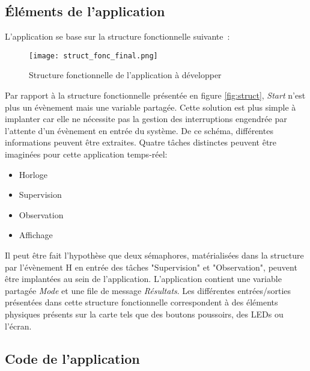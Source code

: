\subsection{Éléments de l'application}

L'application se base sur la structure fonctionnelle suivante :

\begin{figure}[h]
    \centering
    \texttt{[image: struct\_fonc\_final.png]}
    \caption{Structure fonctionnelle de l'application à développer}
    \label{fig:struct_final}
\end{figure}

\indent Par rapport à la structure fonctionnelle présentée en figure \ref{fig:struct}, \textit{Start} n'est plus un évènement mais une variable partagée.
Cette solution est plus simple à implanter car elle ne nécessite pas la gestion des interruptions engendrée par l'attente d'un évènement en entrée du système.
De ce schéma, différentes informations peuvent être extraites.
Quatre tâches distinctes peuvent être imaginées pour cette application temps-réel:

\begin{itemize}
    \item Horloge
    \item Supervision
    \item Observation    
    \item Affichage
\end{itemize}

\indent Il peut être fait l'hypothèse que deux sémaphores, matérialisées dans la structure par l'évènement H en entrée des tâches "Supervision" et "Observation", peuvent être implantées au sein de l'application.
L'application contient une variable partagée \textit{Mode} et une file de message \textit{Résultats}.
Les différentes entrées/sorties présentées dans cette structure fonctionnelle correspondent à des éléments physiques présents sur la carte tels que des boutons poussoirs, des LEDs ou l'écran.

\subsection{Code de l'application}

